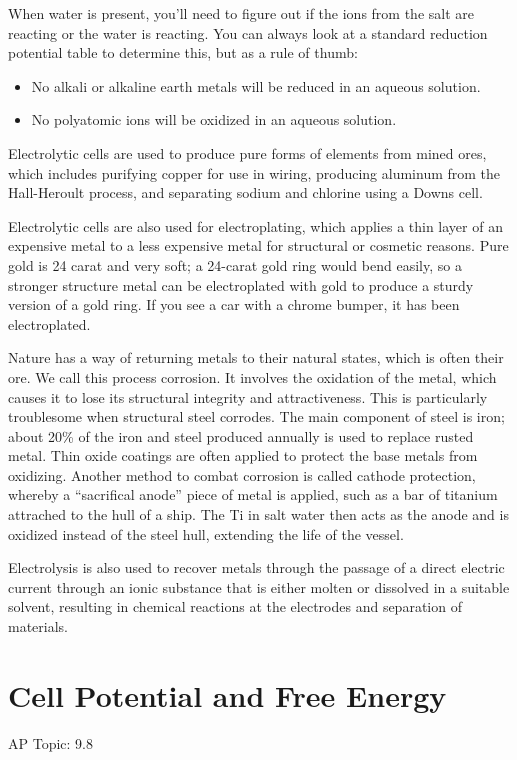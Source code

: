 \documentclass[../chem.tex]{subfiles}
\begin{document}
When water is present, you'll need to figure out if the ions from the salt are reacting or the water is reacting. You can always look at a standard 
reduction potential table to determine this, but as a rule of thumb:
\begin{itemize}
    \item No alkali or alkaline earth metals will be reduced in an aqueous solution.
    \item No polyatomic ions will be oxidized in an aqueous solution.
\end{itemize}

Electrolytic cells are used to produce pure forms of elements from mined ores, which includes purifying copper for use in wiring, producing aluminum from the Hall-Heroult process, and 
separating sodium and chlorine using a Downs cell.

Electrolytic cells are also used for electroplating, which applies a thin layer of an expensive metal to a less expensive metal for structural 
or cosmetic reasons. Pure gold is 24 carat and very soft; a 24-carat gold ring would bend easily, so a stronger structure metal can be electroplated 
with gold to produce a sturdy version of a gold ring. If you see a car with a chrome bumper, it has been electroplated.

Nature has a way of returning metals to their natural states, which is often their ore. We call this process corrosion. It involves the oxidation 
of the metal, which causes it to lose its structural integrity and attractiveness. This is particularly troublesome when structural steel corrodes. 
The main component of steel is iron; about 20\% of the iron and steel produced annually is used to replace rusted metal. Thin oxide coatings are 
often applied to protect the base metals from oxidizing. Another method to combat corrosion is called cathode protection, whereby a ``sacrifical anode'' 
piece of metal is applied, such as a bar of titanium attrached to the hull of a ship. The Ti in salt water then acts as the anode and is oxidized 
instead of the steel hull, extending the life of the vessel.

Electrolysis is also used to recover metals through the passage of a direct electric current through an ionic substance that is either molten or 
dissolved in a suitable solvent, resulting in chemical reactions at the electrodes and separation of materials.
\section{Cell Potential and Free Energy}
AP Topic: 9.8
\end{document}
